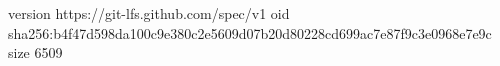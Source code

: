 version https://git-lfs.github.com/spec/v1
oid sha256:b4f47d598da100c9e380c2e5609d07b20d80228cd699ac7e87f9c3e0968e7e9c
size 6509
